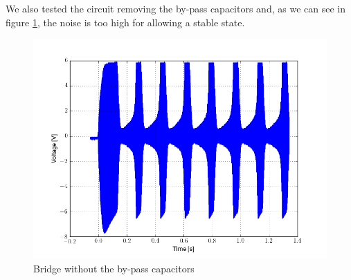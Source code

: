 We also tested the circuit removing the by-pass capacitors and, as we can see in figure \ref{without_bypass}, the noise is too high for allowing a stable state.

\begin{figure}[H]
\centering
\includegraphics[width=.7\textwidth]{9/without_bypass.png}
\caption{Bridge without the by-pass capacitors}\label{without_bypass}
\end{figure}